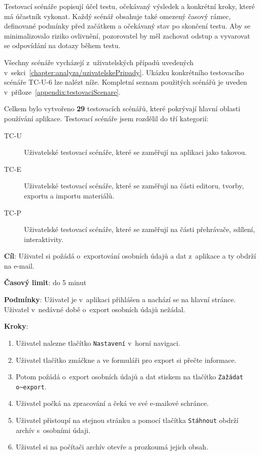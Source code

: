 Testovací scénáře popisují účel testu, očekávaný výsledek a konkrétní kroky, které má účastník vykonat.
Každý scénář obsahuje také omezený časový rámec, definované podmínky před začátkem a očekávaný stav po skončení testu. 
Aby se minimalizovalo riziko ovlivnění, pozorovatel by měl zachovat odstup a vyvarovat se odpovídání na dotazy během testu.

Všechny scénáře vycházejí z~uživatelských případů uvedených v~sekci~\ref{chapter:analyza/uzivatelskePripady}.
Ukázku konkrétního testovacího scénáře TC-U-6 lze nalézt níže. 
Kompletní seznam použitých scénářů je uveden v~příloze~\ref{appendix:testovaciScenare}.

Celkem bylo vytvořeno \textbf{29} testovacích scénářů, které pokrývají hlavní oblasti používání aplikace.
Testovací scénáře jsem rozdělil do tří kategorií:

\begin{description}
    \item[TC-U] Uživatelské testovací scénáře, které se zaměřují na aplikaci jako takovou. 
    \item[TC-E] Uživatelské testovací scénáře, které se zaměřují na části editoru, tvorby, exportu a importu materiálů.
    \item[TC-P] Uživatelské testovací scénáře, které se zaměřují na části přehrávače, sdílení, interaktivity.
\end{description}


\vspace{1em}

\textbf{Cíl}: Uživatel si požádá o~exportování osobních údajů a dat z~aplikace a ty obdrží na e-mail.

\textbf{Časový limit}: do 5 minut

\textbf{Podmínky}: Uživatel je v~aplikaci přihlášen a nachází se na hlavní stránce. Uživatel v~nedávné době o~export osobních údajů nežádal.

\textbf{Kroky}:

\begin{enumerate}[leftmargin=1.4cm]
    \item Uživatel nalezne tlačítko \verb|Nastavení| v~horní navigaci.
    \item Uživatel tlačítko zmáčkne a ve formuláři pro export si přečte informace.
    \item Potom požádá o~export osobních údajů a dat stiskem na tlačítko \verb|Zažádat o~export|.
    \item Uživatel počká na zpracování a čeká ve své e-mailové schránce.
    \item Uživatel přistoupí na stejnou stránku a pomocí tlačítka \verb|Stáhnout| obdrží archív s~osobními údaji.
    \item Uživatel si na počítači archív otevře a prozkoumá jejich obsah.
\end{enumerate}

